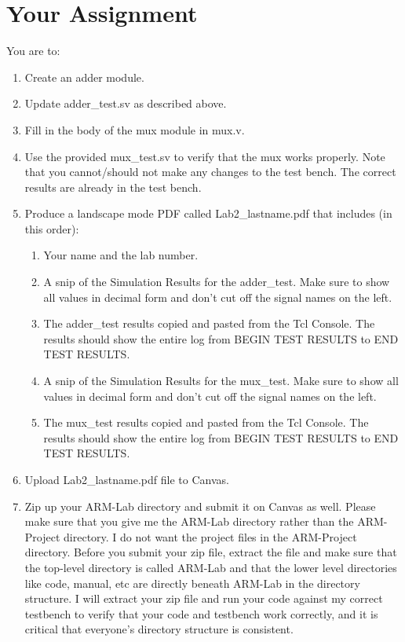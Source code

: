 \section{Your Assignment}

You are to:
\begin{enumerate}
\item Create an adder module.
\item Update adder\_test.sv as described above.	
\item Fill in the body of the mux module in mux.v.
\item Use the provided mux\_test.sv to verify that the mux works properly.  Note that you cannot/should not make any changes to the test bench.  The correct results are already in the test bench.	
\item Produce a landscape mode PDF called Lab2\_lastname.pdf that includes (in this order):
\begin{enumerate}
	\item Your name and the lab number.
	\item A snip of the Simulation Results for the adder\_test.  Make sure to show all values in decimal form and don't cut off the signal names on the left.  
	\item The adder\_test results copied and pasted from the Tcl Console.  The results should show the entire log from BEGIN TEST RESULTS to END TEST RESULTS.
	\item A snip of the Simulation Results for the mux\_test.  Make sure to show all values in decimal form and don't cut off the signal names on the left.  
	\item The mux\_test results copied and pasted from the Tcl Console.  The results should show the entire log from BEGIN TEST RESULTS to END TEST RESULTS.
\end{enumerate}
\item Upload Lab2\_lastname.pdf file to Canvas.
\item Zip up your ARM-Lab directory and submit it on Canvas as well.  Please make sure that you give me the ARM-Lab directory rather than the ARM-Project directory.  I do not want the project files in the ARM-Project directory.  Before you submit your zip file, extract the file and make sure that the top-level directory is called ARM-Lab and that the lower level directories like code, manual, etc are directly beneath ARM-Lab in the directory structure.  I will extract your zip file and run your code against my correct testbench to verify that your code and testbench work correctly, and it is critical that everyone's directory structure is consistent.
\end{enumerate} 